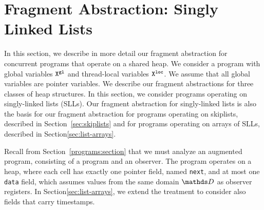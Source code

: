 \section{Fragment Abstraction: Singly Linked Lists}
\label{sec:fragment-abstraction}
In this section, we describe in more detail our fragment abstraction for
concurrent programs that operate on a shared heap.
We consider a program with global variables ${\tt X}^{\tt gl}$ and
thread-local variables ${\tt X}^{\tt loc}$.
We assume that all global variables are pointer variables.
We describe our fragment abstractions for three classes of heap structures.
In this section, we consider programs operating on singly-linked lists (SLLs).
Our fragment abstraction for singly-linked lists is also
the basis for our fragment abstraction for programs
operating on skiplists, described in Section~\ref{sec:skiplists}
and for programs operating on arrays of SLLs, described in
Section\ref{sec:list-arrays}.


Recall from Section~\ref{programs:section} that
we must analyze an augmented program, consisting of a program and an observer.
The program operates on a heap, where each cell has exactly one
pointer field, named {\tt next}, and at most one {\tt data} field, which
assumes values from the same domain $\ddomain$ as observer registers.
In Section\ref{sec:list-arrays}, we extend the treatment to consider also fields
that carry timestamps.

